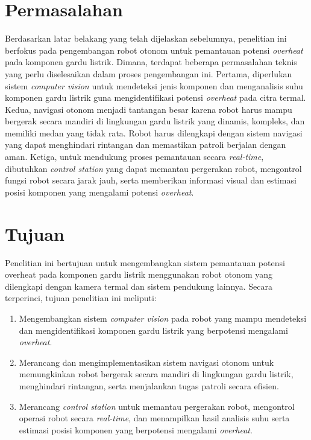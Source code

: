\section{Permasalahan}
Berdasarkan latar belakang yang telah dijelaskan sebelumnya, penelitian ini berfokus pada pengembangan robot otonom untuk pemantauan potensi \emph{overheat} pada komponen gardu listrik. Dimana, terdapat beberapa permasalahan teknis yang perlu diselesaikan dalam proses pengembangan ini. Pertama, diperlukan sistem \emph{computer vision} untuk mendeteksi jenis komponen dan menganalisis suhu komponen gardu listrik guna mengidentifikasi potensi \emph{overheat} pada citra termal. Kedua, navigasi otonom menjadi tantangan besar karena robot harus mampu bergerak secara mandiri di lingkungan gardu listrik yang dinamis, kompleks, dan memiliki medan yang tidak rata. Robot harus dilengkapi dengan sistem navigasi yang dapat menghindari rintangan dan memastikan patroli berjalan dengan aman. Ketiga, untuk mendukung proses pemantauan secara \emph{real-time}, dibutuhkan \emph{control station} yang dapat memantau pergerakan robot, mengontrol fungsi robot secara jarak jauh, serta memberikan informasi visual dan estimasi posisi komponen yang mengalami potensi \emph{overheat}.


\section{Tujuan}
\label{sec:Tujuan}
Penelitian ini bertujuan untuk mengembangkan sistem pemantauan potensi overheat pada komponen gardu listrik menggunakan robot otonom yang dilengkapi dengan kamera termal dan sistem pendukung lainnya. Secara terperinci, tujuan penelitian ini meliputi:
\begin{enumerate}
      \item Mengembangkan sistem \emph{computer vision} pada robot yang mampu mendeteksi dan mengidentifikasi komponen gardu listrik yang berpotensi mengalami \emph{overheat}.
      \item Merancang dan mengimplementasikan sistem navigasi otonom untuk memungkinkan robot bergerak secara mandiri di lingkungan gardu listrik, menghindari rintangan, serta menjalankan tugas patroli secara efisien.
      \item Merancang \emph{control station} untuk memantau pergerakan robot, mengontrol operasi robot secara \emph{real-time}, dan menampilkan hasil analisis suhu serta estimasi posisi komponen yang berpotensi mengalami \emph{overheat}.
\end{enumerate}

